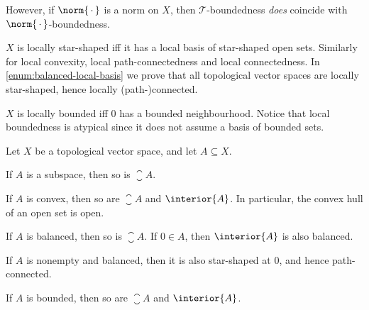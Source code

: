 \documentclass[article, a4paper, 11pt, oneside]{memoir}
\numberwithin{equation}{chapter}
\newcommand{\calT}{\mathcal{T}}
\begin{document}
\begin{remark}
\begin{enumrem}
        However, if $\norm{\,\cdot\,}$ is a norm on $X$, then $\calT$-boundedness \emph{does} coincide with $\norm{\,\cdot\,}$-boundedness.
        
        \item $X$ is locally star-shaped iff it has a local basis of star-shaped open sets. Similarly for local convexity, local path-connectedness and local connectedness. In \cref{enum:balanced-local-basis} we prove that all topological vector spaces are locally star-shaped, hence locally (path-)connected.

        \item $X$ is locally bounded iff $0$ has a bounded neighbourhood. Notice that local boundedness is atypical since it does not assume a basis of bounded sets.
    \end{enumrem}
\end{remark}


\begin{lemma}
    Let $X$ be a topological vector space, and let $A \subseteq X$.
    \begin{enumlem}
        \item \label{enum:closure-of-subspace} If $A$ is a subspace, then so is $\closure{A}$.
        
        \item \label{enum:convex-closure-interior} If $A$ is convex, then so are $\closure{A}$ and $\interior{A}$. In particular, the convex hull of an open set is open.
        
        \item \label{enum:balanced-closure-interior} If $A$ is balanced, then so is $\closure{A}$. If $0 \in A$, then $\interior{A}$ is also balanced.

        \item \label{enum:balanced-implies-connected} If $A$ is nonempty and balanced, then it is also star-shaped at $0$, and hence path-connected.
        
        \item \label{enum:bounded-closure-interior} If $A$ is bounded, then so are $\closure{A}$ and $\interior{A}$.
    \end{enumlem}
\end{lemma}
\end{document}
